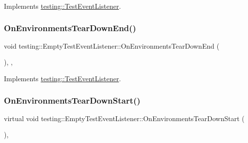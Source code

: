 Implements \mbox{\hyperlink{classtesting_1_1_test_event_listener_a9ea04fa7f447865ba76df35e12ba2092}{testing\+::\+Test\+Event\+Listener}}.

\mbox{\label{classtesting_1_1_empty_test_event_listener_ad9984052e82c3ae26395a2d9480326d2}} 
\subsubsection{\texorpdfstring{OnEnvironmentsTearDownEnd()}{OnEnvironmentsTearDownEnd()}\hspace{0.1cm}{\footnotesize\ttfamily [3/3]}}
{\footnotesize\ttfamily void testing\+::\+Empty\+Test\+Event\+Listener\+::\+On\+Environments\+Tear\+Down\+End (\begin{DoxyParamCaption}\item[{const \mbox{\hyperlink{classtesting_1_1_unit_test}{Unit\+Test}} \&}]{ }\end{DoxyParamCaption})\hspace{0.3cm}{\ttfamily [inline]}, {\ttfamily [override]}, {\ttfamily [virtual]}}



Implements \mbox{\hyperlink{classtesting_1_1_test_event_listener_a9ea04fa7f447865ba76df35e12ba2092}{testing\+::\+Test\+Event\+Listener}}.

\mbox{\label{classtesting_1_1_empty_test_event_listener_a00fa1a4ea5831e20746188414268e7c6}} 
\subsubsection{\texorpdfstring{OnEnvironmentsTearDownStart()}{OnEnvironmentsTearDownStart()}\hspace{0.1cm}{\footnotesize\ttfamily [1/3]}}
{\footnotesize\ttfamily virtual void testing\+::\+Empty\+Test\+Event\+Listener\+::\+On\+Environments\+Tear\+Down\+Start (\begin{DoxyParamCaption}\item[{const \mbox{\hyperlink{classtesting_1_1_unit_test}{Unit\+Test}} \&}]{ }\end{DoxyParamCaption})\hspace{0.3cm}{\ttfamily [inline]}, {\ttfamily [virtual]}}



